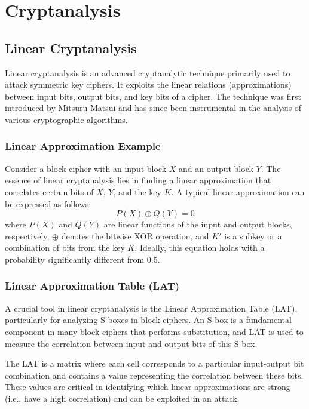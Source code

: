 \chapter{Cryptanalysis}

\section{Linear Cryptanalysis}

Linear cryptanalysis is an advanced cryptanalytic technique primarily used to attack symmetric key ciphers. It exploits the linear relations (approximations) between input bits, output bits, and key bits of a cipher. The technique was first introduced by Mitsuru Matsui and has since been instrumental in the analysis of various cryptographic algorithms.

\subsection{Linear Approximation Example}

Consider a block cipher with an input block $X$ and an output block $Y$. The essence of linear cryptanalysis lies in finding a linear approximation that correlates certain bits of $X$, $Y$, and the key $K$. A typical linear approximation can be expressed as follows:
\[ P(X) \oplus Q(Y) = 0 \]
where $P(X)$ and $Q(Y)$ are linear functions of the input and output blocks, respectively, $\oplus$ denotes the bitwise XOR operation, and $K'$ is a subkey or a combination of bits from the key $K$. Ideally, this equation holds with a probability significantly different from 0.5.

\subsection{Linear Approximation Table (LAT)}

A crucial tool in linear cryptanalysis is the Linear Approximation Table (LAT), particularly for analyzing S-boxes in block ciphers. An S-box is a fundamental component in many block ciphers that performs substitution, and LAT is used to measure the correlation between input and output bits of this S-box.

The LAT is a matrix where each cell corresponds to a particular input-output bit combination and contains a value representing the correlation between these bits. These values are critical in identifying which linear approximations are strong (i.e., have a high correlation) and can be exploited in an attack.


